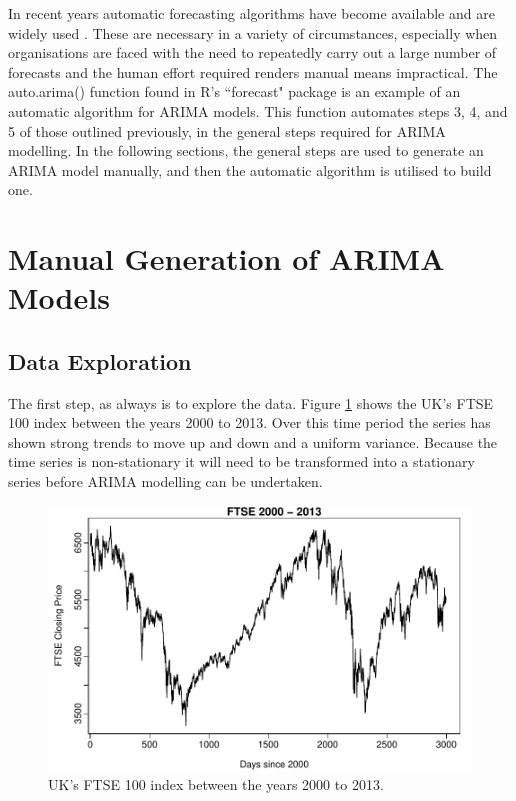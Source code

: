 In recent years automatic forecasting algorithms have become available and are widely used \citep{Hyndman08automatictime}. These are necessary in a variety of circumstances, especially when organisations are faced with the need to repeatedly carry out a large number of forecasts and the human effort required renders manual means impractical. The auto.arima() function found in R's \textquotedblleft forecast" package is an example of an automatic algorithm for ARIMA models. This function automates steps 3, 4, and 5 of those outlined previously, in the general steps required for ARIMA modelling. In the following sections, the general steps are used to generate an ARIMA model manually, and then the automatic algorithm is utilised to build one.

\section{Manual Generation of ARIMA Models}
\label{sec:man_arima}
\subsection{Data Exploration}

The first step, as always is to explore the data. Figure \ref{fig:chp_ts_ftse_2000_13} shows the UK's FTSE 100 index between the years 2000 to 2013. Over this time period the series has shown strong trends to move up and down and a uniform variance. Because the time series is non-stationary it will need to be transformed into a stationary series before ARIMA modelling can be undertaken.

\begin{figure}[tbh]
\centering
\includegraphics{Figures/chp_ts_ftse_2000-13}
\caption[FTSE 100 index between the years 2000 to 2013]{UK's FTSE 100 index between the years 2000 to 2013.}
\label{fig:chp_ts_ftse_2000_13}
\end{figure}

